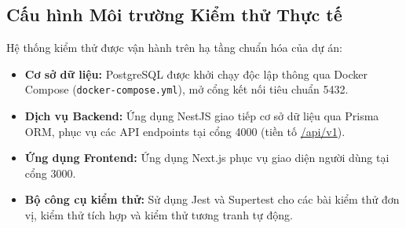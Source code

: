 \documentclass[12pt,a4paper,oneside]{report}
\begin{document}
\subsection{Cấu hình Môi trường Kiểm thử Thực tế}
Hệ thống kiểm thử được vận hành trên hạ tầng chuẩn hóa của dự án:
\begin{itemize}
    \item \textbf{Cơ sở dữ liệu:} PostgreSQL được khởi chạy độc lập thông qua Docker Compose (\texttt{docker-}\allowbreak\texttt{compose.yml}), mở cổng kết nối tiêu chuẩn 5432.
    \item \textbf{Dịch vụ Backend:} Ứng dụng NestJS giao tiếp cơ sở dữ liệu qua Prisma ORM, phục vụ các API endpoints tại cổng 4000 (tiền tố \url{/api/v1}).
    \item \textbf{Ứng dụng Frontend:} Ứng dụng Next.js phục vụ giao diện người dùng tại cổng 3000.
    \item \textbf{Bộ công cụ kiểm thử:} Sử dụng Jest và Supertest cho các bài kiểm thử đơn vị, kiểm thử tích hợp và kiểm thử tương tranh tự động.
\end{itemize}
\end{document}
